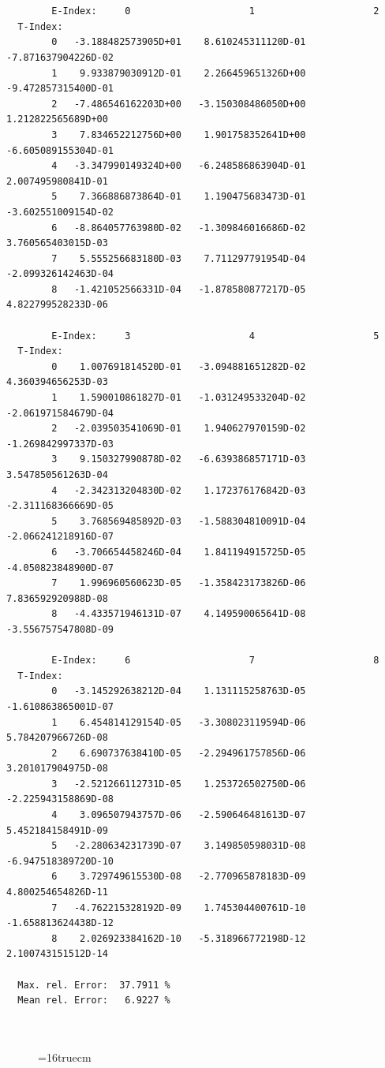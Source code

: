 \documentclass[12pt,dvips]{article}
\begin{document}
\begin{small}\begin{verbatim}


        E-Index:     0                     1                     2
  T-Index:
        0   -3.188482573905D+01    8.610245311120D-01   -7.871637904226D-02
        1    9.933879030912D-01    2.266459651326D+00   -9.472857315400D-01
        2   -7.486546162203D+00   -3.150308486050D+00    1.212822565689D+00
        3    7.834652212756D+00    1.901758352641D+00   -6.605089155304D-01
        4   -3.347990149324D+00   -6.248586863904D-01    2.007495980841D-01
        5    7.366886873864D-01    1.190475683473D-01   -3.602551009154D-02
        6   -8.864057763980D-02   -1.309846016686D-02    3.760565403015D-03
        7    5.555256683180D-03    7.711297791954D-04   -2.099326142463D-04
        8   -1.421052566331D-04   -1.878580877217D-05    4.822799528233D-06

        E-Index:     3                     4                     5
  T-Index:
        0    1.007691814520D-01   -3.094881651282D-02    4.360394656253D-03
        1    1.590010861827D-01   -1.031249533204D-02   -2.061971584679D-04
        2   -2.039503541069D-01    1.940627970159D-02   -1.269842997337D-03
        3    9.150327990878D-02   -6.639386857171D-03    3.547850561263D-04
        4   -2.342313204830D-02    1.172376176842D-03   -2.311168366669D-05
        5    3.768569485892D-03   -1.588304810091D-04   -2.066241218916D-07
        6   -3.706654458246D-04    1.841194915725D-05   -4.050823848900D-07
        7    1.996960560623D-05   -1.358423173826D-06    7.836592920988D-08
        8   -4.433571946131D-07    4.149590065641D-08   -3.556757547808D-09

        E-Index:     6                     7                     8
  T-Index:
        0   -3.145292638212D-04    1.131115258763D-05   -1.610863865001D-07
        1    6.454814129154D-05   -3.308023119594D-06    5.784207966726D-08
        2    6.690737638410D-05   -2.294961757856D-06    3.201017904975D-08
        3   -2.521266112731D-05    1.253726502750D-06   -2.225943158869D-08
        4    3.096507943757D-06   -2.590646481613D-07    5.452184158491D-09
        5   -2.280634231739D-07    3.149850598031D-08   -6.947518389720D-10
        6    3.729749615530D-08   -2.770965878183D-09    4.800254654826D-11
        7   -4.762215328192D-09    1.745304400761D-10   -1.658813624438D-12
        8    2.026923384162D-10   -5.318966772198D-12    2.100743151512D-14

  Max. rel. Error:  37.7911 %
  Mean rel. Error:   6.9227 %



\end{verbatim}\end{small}
\begin{figure} \label{2.3.2e}
\epsfxsize=16truecm
\end{figure}
\newpage
\end{document}

